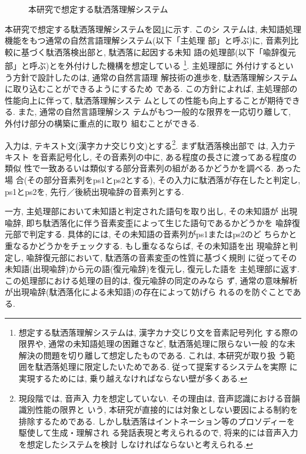 {\unitlength=1mm
\begin{figure}
\begin{center}
 \vspace{-0.7cm}
    
    
    
\caption{本研究で想定する駄洒落理解システム}\label{joke-system}
\end{center}
\end{figure}}
本研究で想定する駄洒落理解システムを図\ref{joke-system}に示す. このシ
ステムは, 未知語処理機能をもつ通常の自然言語理解システム(以下「主処理
部」と呼ぶ)に, 音素列比較に基づく駄洒落検出部と, 駄洒落に起因する未知
語の処理部(以下「喩辞復元部」と呼ぶ)とを外付けした機構を想定している
\footnote{想定する駄洒落理解システムは, 漢字カナ交じり文を音素記号列化
する際の限界や, 通常の未知語処理の困難さなど, 駄洒落処理に限らない一般
的な未解決の問題を切り離して想定したものである. これは, 本研究が取り扱
う範囲を駄洒落処理に限定したいためである. 従って提案するシステムを実際
に実現するためには, 乗り越えなければならない壁が多くある.}. 主処理部に
外付けするという方針で設計したのは, 通常の自然言語理
解技術の進歩を, 駄洒落理解システムに取り込むことができるようにするため
である. この方針によれば, 主処理部の性能向上に伴って, 駄洒落理解システ
ムとしての性能も向上することが期待できる. また, 通常の自然言語理解シス
テムがもつ一般的な限界を一応切り離して, 外付け部分の構築に重点的に取り
組むことができる.  

入力は, テキスト文(漢字カナ交じり文)とする\footnote{現段階では, 音声入
力を想定していない. その理由は, 音声認識における音韻識別性能の限界と
いう, 本研究が直接的には対象としない要因による制約を排除するためである. 
しかし駄洒落はイントネーション等のプロソディーを駆使して生成・理解され
る発話表現と考えられるので, 将来的には音声入力を想定したシステムを検討
しなければならないと考えられる. }. まず駄洒落検出部で は, 入力テキスト
を音素記号化し, その音素列の中に, ある程度の長さに渡ってある程度の類似
性で一致あるいは類似する部分音素列の組があるかどうかを調べる. あった場
合(その部分音素列をps1とps2とする), その入力に駄洒落が存在したと判定し,
ps1とps2を, 先行／後続出現喩辞の音素列とする.  

一方, 主処理部において未知語と判定された語句を取り出し, その未知語が
出現喩辞, 即ち駄洒落化に伴う音素変歪によって生じた語句であるかどうかを
喩辞復元部で判定する. 具体的には, その未知語の音素列がps1またはps2のど
ちらかと重なるかどうかをチェックする. もし重なるならば, その未知語を出
現喩辞と判定し, 喩辞復元部において, 駄洒落の音素変歪の性質に基づく規則
に従ってその未知語(出現喩辞)から元の語(復元喩辞)を復元し, 復元した語を
主処理部に返す. この処理部における処理の目的は, 復元喩辞の同定のみなら
ず, 通常の意味解析が出現喩辞(駄洒落化による未知語)の存在によって妨げら
れるのを防ぐことである.

